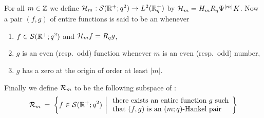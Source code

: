 \begin{defn*} \label{def:Hmpair}
For all $m\in\mathbb{Z}$ we define ${\mathcal H}_{m} : {\mathcal S}(\mathbb{R}^+;q^2) \rightarrow L^2(\mathbb{R}_q^+)$
by \mbox{${\mathcal H}_{m} = H_m R_q \Psi^{|m|} K$}\@. Now a pair $(f,g)$
of entire functions is said to be an {\em \Hmpair\/} whenever
\begin{enumerate}
\item $f\in {\mathcal S}(\mathbb{R}^+;q^2)$ and ${\mathcal H}_{m} f = R_q g$,
\item $g$ is an even (resp.\ odd) function whenever $m$ is an even (resp.\ odd) number,
\item $g$ has a zero at the origin of order at least $|m|$.
\end{enumerate}
Finally we define ${\mathcal R}_{m}$ to be the following subspace of \Swqbis:
$$ {\mathcal R}_{m} \:= \: \left\{ f\in {\mathcal S}(\mathbb{R}^+;q^2) \:\left|\:
                \begin{array}{l}
                   \mbox{there exists an entire function $g$ such} \\
                   \mbox{that $(f,g)$ is an \mbox{$(m;q)$-Hankel} pair}
                \end{array}\!\right.\right\}$$
\end{defn*}

